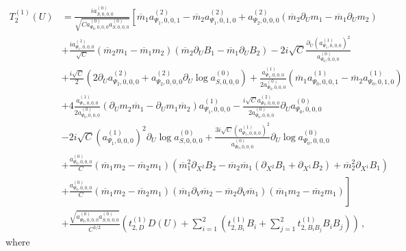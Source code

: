 	\begin{equation}
	\begin{aligned}
	T_{2}^{(1)}(U) &= \frac{i a^{(0)}_{S,0,0,0}}{\sqrt{C a^{(0)}_{\Psi_0,0,0,0} a^{(0)}_{S,0,0,0}}} \left\lbrack   \overline{m}_{1} a^{(2)}_{\Psi_1,0,0,1}-\overline{m}_{2} a^{(2)}_{\Psi_1,0,1,0} + a^{(2)}_{\Psi_2,0,0,0} \left(\overline{m}_{2}\partial_{U}m_{1} - \overline{m}_{1}\partial_{U}m_{2}\right) \right.  \\ &+ \frac{i a^{(1)}_{\Psi_1,0,0,0}}{\sqrt{C}}  \left(\overline{m}_{2} m_{1}-\overline{m}_{1} m_{2}\right)   \left(\overline{m}_{2} \partial_{U} B_1-\overline{m}_{1} \partial_{U} B_2\right) -2 i \sqrt{C} \frac{\partial_U (a^{(1)}_{\Psi_1,0,0,0})^2}{ a^{(0)}_{\Psi_0,0,0,0}}  \\ & +\frac{i \sqrt{C}}{2} \left(2  \partial_{U} a^{(2)}_{\Psi_2,0,0,0}{}+a^{(2)}_{\Psi_2,0,0,0} \partial_{U} \log a^{(0)}_{S,0,0,0}\right)  +  \frac{a^{(1)}_{\Psi_1,0,0,0}}{2 a^{(0)}_{\Psi_0,0,0,0}}   \left(\overline{m}_{1} a^{(1)}_{\Psi_0,0,0,1}-\overline{m}_{2} a^{(1)}_{\Psi_0,0,1,0}\right) \\ &+4 \frac{a^{(1)}_{\Psi_1,0,0,0}}{2 a^{(0)}_{\Psi_0,0,0,0}} (\partial_{U}m_{2} \overline{m}_{1}-\partial_{U}m_{1} \overline{m}_{2}) a^{(1)}_{\Psi_1,0,0,0}  - \frac{i \sqrt{C}a^{(2)}_{\Psi_2,0,0,0}}{2 a^{(0)}_{\Psi_0,0,0,0}}   \partial_U a^{(0)}_{\Psi_0,0,0,0} \\ &-2 i \sqrt{C} (a^{(1)}_{\Psi_1,0,0,0})^2 \partial_U \log a^{(0)}_{S,0,0,0} +\frac{3 i \sqrt{C} (a^{(1)}_{\Psi_1,0,0,0})^2}{a^{(0)}_{\Psi_0,0,0,0}} \partial_U \log a^{(0)}_{\Psi_0,0,0,0} \\ &  +\frac{a^{(0)}_{\Psi_0,0,0,0}}{C} \left(\overline{m}_{1} m_{2}-\overline{m}_{2} m_{1}\right)  \left(\overline{m}_{1}^2 \partial_{X^2} B_2-\overline{m}_{2} \overline{m}_{1} \left(\partial_{X^2} B_1+\partial_{X^1} B_2\right) +\overline{m}^2_{2} \partial_{X^1} B_1 \right) \\ & \left. + \frac{a^{(0)}_{\Psi_0,0,0,0}}{C} \left(\overline{m}_{1} m_{2}-\overline{m}_{2} m_{1}\right) (\overline{m}_{1} \partial_{V}\overline{m}_{2} - \overline{m}_{2}\partial_{V}\overline{m}_{1} ) (\overline{m}_{1} m_{2}-\overline{m}_{2} m_{1}) \right\rbrack \\ 
	&+ \frac{\sqrt{a^{(0)}_{\Psi_0,0,0,0} a^{(0)}_{S,0,0,0}}}{C^{3/2}}   \left(t_{2,D}^{(1)} D(U) + \sum^2_{i=1}\left(t_{2,B_i}^{(1)} B_i+ \sum^2_{j=1} t_{2,B_i B_j }^{(1)} B_i B_j \right)\right)\, , 
	\end{aligned}
	\end{equation}
	where
